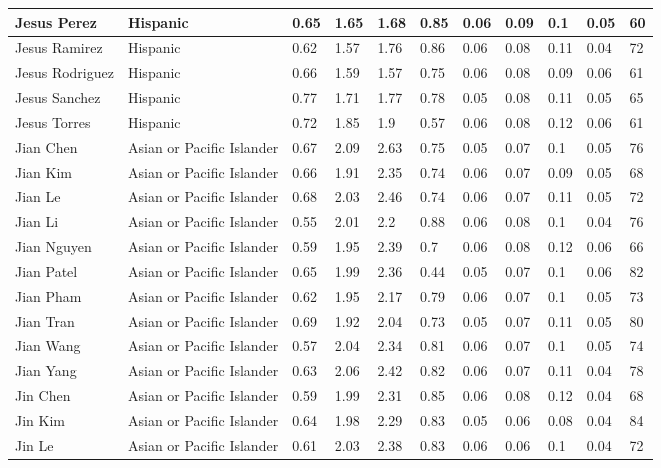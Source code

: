 \begin{table}[!ht]
\begin{tabular}{|l|l|l|l|l|l|l|l|l|l|l|}
        Jesus Perez & Hispanic & 0.65 & 1.65 & 1.68 & 0.85 & 0.06 & 0.09 & 0.1 & 0.05 & 60 \\ \hline
        Jesus Ramirez & Hispanic & 0.62 & 1.57 & 1.76 & 0.86 & 0.06 & 0.08 & 0.11 & 0.04 & 72 \\ \hline
        Jesus Rodriguez & Hispanic & 0.66 & 1.59 & 1.57 & 0.75 & 0.06 & 0.08 & 0.09 & 0.06 & 61 \\ \hline
        Jesus Sanchez & Hispanic & 0.77 & 1.71 & 1.77 & 0.78 & 0.05 & 0.08 & 0.11 & 0.05 & 65 \\ \hline
        Jesus Torres & Hispanic & 0.72 & 1.85 & 1.9 & 0.57 & 0.06 & 0.08 & 0.12 & 0.06 & 61 \\ \hline
        Jian Chen & Asian or Pacific Islander & 0.67 & 2.09 & 2.63 & 0.75 & 0.05 & 0.07 & 0.1 & 0.05 & 76 \\ \hline
        Jian Kim & Asian or Pacific Islander & 0.66 & 1.91 & 2.35 & 0.74 & 0.06 & 0.07 & 0.09 & 0.05 & 68 \\ \hline
        Jian Le & Asian or Pacific Islander & 0.68 & 2.03 & 2.46 & 0.74 & 0.06 & 0.07 & 0.11 & 0.05 & 72 \\ \hline
        Jian Li & Asian or Pacific Islander & 0.55 & 2.01 & 2.2 & 0.88 & 0.06 & 0.08 & 0.1 & 0.04 & 76 \\ \hline
        Jian Nguyen & Asian or Pacific Islander & 0.59 & 1.95 & 2.39 & 0.7 & 0.06 & 0.08 & 0.12 & 0.06 & 66 \\ \hline
        Jian Patel & Asian or Pacific Islander & 0.65 & 1.99 & 2.36 & 0.44 & 0.05 & 0.07 & 0.1 & 0.06 & 82 \\ \hline
        Jian Pham & Asian or Pacific Islander & 0.62 & 1.95 & 2.17 & 0.79 & 0.06 & 0.07 & 0.1 & 0.05 & 73 \\ \hline
        Jian Tran & Asian or Pacific Islander & 0.69 & 1.92 & 2.04 & 0.73 & 0.05 & 0.07 & 0.11 & 0.05 & 80 \\ \hline
        Jian Wang & Asian or Pacific Islander & 0.57 & 2.04 & 2.34 & 0.81 & 0.06 & 0.07 & 0.1 & 0.05 & 74 \\ \hline
        Jian Yang & Asian or Pacific Islander & 0.63 & 2.06 & 2.42 & 0.82 & 0.06 & 0.07 & 0.11 & 0.04 & 78 \\ \hline
        Jin Chen & Asian or Pacific Islander & 0.59 & 1.99 & 2.31 & 0.85 & 0.06 & 0.08 & 0.12 & 0.04 & 68 \\ \hline
        Jin Kim & Asian or Pacific Islander & 0.64 & 1.98 & 2.29 & 0.83 & 0.05 & 0.06 & 0.08 & 0.04 & 84 \\ \hline
        Jin Le & Asian or Pacific Islander & 0.61 & 2.03 & 2.38 & 0.83 & 0.06 & 0.06 & 0.1 & 0.04 & 72 \\ \hline

\end{tabular}
\end{table}
